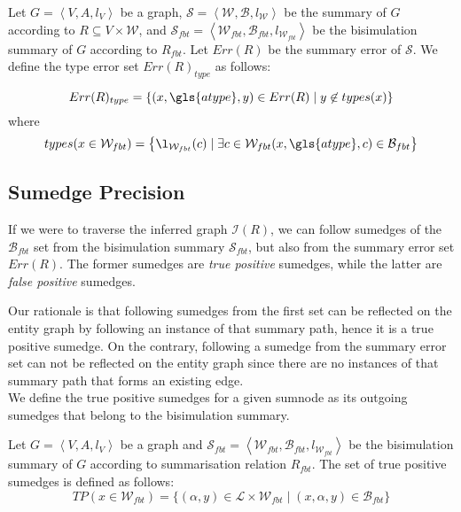 \begin{definition}
	Let $G=\left\langle V, A, l_V \right\rangle$ be a graph, $\mathcal{S} = \left\langle \mathcal{W}, \mathcal{B}, l_{\mathcal{W}} \right\rangle$ be the summary of $G$ according to $R \subseteq V \times \mathcal{W}$, and $\mathcal{S}_{fbt} = \left\langle \mathcal{W}_{fbt}, \mathcal{B}_{fbt}, l_{\mathcal{W}_{fbt}} \right\rangle$ be the bisimulation summary of $G$ according to $R_{fbt}$. Let $Err(R)$ be the summary error of $\mathcal{S}$. We define the type error set $Err(R)_{type}$ as follows:

	$$
	Err(R)_{type} = \left\lbrace (x, \gls{atype}, y) \in Err(R) \mid y \not \in types(x) \right\rbrace
	$$
	where
	$$
	types(x \in \mathcal{W}_{fbt}) = \left\lbrace \l_{\mathcal{W}_{fbt}}(c) \mid \exists c \in \mathcal{W}_{fbt} (x, \gls{atype}, c) \in \mathcal{B}_{fbt} \right\rbrace
	$$
\end{definition}

\subsection{Sumedge Precision}
\label{sec:edge-precision}

If we were to traverse the inferred graph $\mathcal{I}(R)$, we can follow sumedges of the $\mathcal{B}_{fbt}$ set from the bisimulation summary $\mathcal{S}_{fbt}$, but also from the summary error set $Err(R)$. The former sumedges are \emph{true positive} sumedges, while the latter are \emph{false positive} sumedges.

Our rationale is that following sumedges from the first set can be reflected on the entity graph by following an instance of that summary path, hence it is a true positive sumedge. On the contrary, following a sumedge from the summary error set can not be reflected on the entity graph since there are no instances of that summary path that forms an existing edge.\\

We define the true positive sumedges for a given sumnode as its outgoing sumedges that belong to the bisimulation summary.

\begin{definition}
Let $G=\left\langle V, A, l_V \right\rangle$ be a graph and $\mathcal{S}_{fbt} = \left\langle \mathcal{W}_{fbt}, \mathcal{B}_{fbt}, l_{\mathcal{W}_{fbt}} \right\rangle$ be the bisimulation summary of $G$ according to summarisation relation $R_{fbt}$.
The set of true positive sumedges is defined as follows:
$$
TP(x \in \mathcal{W}_{fbt}) = \{ (\alpha, y) \in \mathcal{L} \times \mathcal{W}_{fbt} \mid (x, \alpha, y) \in \mathcal{B}_{fbt} \}
$$
\end{definition}

